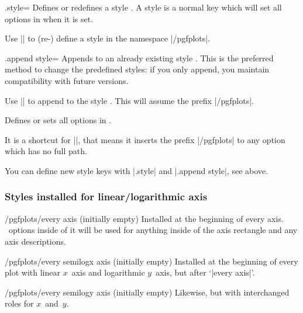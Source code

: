 \begin{handler}{{.style}=}
	Defines or redefines a style . A style is a normal key which will set all options in  when it is set.

	Use	|| to (re-) define a style  in the namespace |/pgfplots|.
\end{handler}

\begin{handler}{{.append style}=}
	Appends  to an already existing style . This is the preferred method to change the predefined styles: if you only append, you maintain compatibility with future versions.

	Use	|| to append  to the style . This will assume the prefix |/pgfplots|.
\end{handler}

\begin{command}{\pgfplotsset{}}
	Defines or sets all options in .
	
	It is a shortcut for ||, that means it inserts the prefix |/pgfplots| to any option which has no full path.

	You can define new style keys with |.style| and |.append style|, see above.
\end{command}

\subsubsection*{Styles installed for linear/logarithmic axis}

\begin{stylekey}{/pgfplots/every axis (initially empty)}
 Installed at the beginning of every axis. \Tikz\ options inside of it will be used for anything inside of the axis rectangle and any axis descriptions.
\end{stylekey}

\begin{stylekey}{/pgfplots/every semilogx axis (initially empty)}
 Installed at the beginning of every plot with linear $x$~axis and logarithmic $y$~axis, but after `|every axis|'.
\end{stylekey}

\begin{stylekey}{/pgfplots/every semilogy axis (initially empty)}
 Likewise, but with interchanged roles for $x$~and~$y$.
\end{stylekey}


